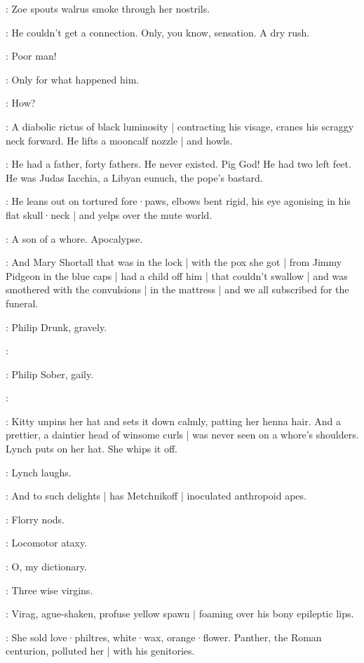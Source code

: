 :
Zoe spouts walrus smoke through her nostrils.

\Zoe:
He couldn't get a connection.
Only,
you know,
sensation.
A dry rush.

\Bloom:
Poor man!

\Zoe:
Only for what happened him.

\Bloom:
How?

:
A diabolic rictus of black luminosity |
contracting his visage,
cranes his scraggy neck forward.
He lifts a mooncalf nozzle |
and howls.

\Virag:
He had a father,
forty fathers.
He never existed.
Pig God!
He had two left feet.
He was Judas Iacchia,
a Libyan eunuch,
the pope's bastard.

:
He leans out on tortured fore·paws,
elbows bent rigid,
his eye agonising in his flat skull·neck |
and yelps over the mute world.

\Virag:
A son of a whore.
Apocalypse.

\Kitty[2]:
And Mary Shortall that was in the lock |
with the pox she got |
from Jimmy Pidgeon in the blue caps |
had a child off him |
that couldn't swallow |
and was smothered with the convulsions |
in the mattress |
and we all subscribed for the funeral.

:
Philip Drunk,
gravely.

\PhilipDrunk:

:
Philip Sober,
gaily.

\PhilipSober:

:
Kitty unpins her hat and sets it down calmly,
patting her henna hair.
And a prettier,
a daintier head of winsome curls |
was never seen on a whore's shoulders.
Lynch puts on her hat.
She whips it off.

:
Lynch laughs.

\Lynch:
And to such delights |
has Metchnikoff |
inoculated anthropoid apes.

:
Florry nods.

\Florry:
Locomotor ataxy.

\Zoe:
O,
my dictionary.

\Lynch:
Three wise virgins.

:
Virag,
ague-shaken,
profuse yellow spawn |
foaming over his bony epileptic lips.

\Virag:
She sold love·philtres,
white·wax,
orange·flower.
Panther,
the Roman centurion,
polluted her |
with his genitories.

